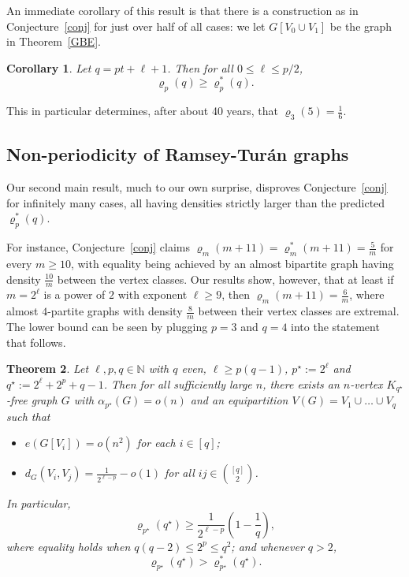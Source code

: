 \documentclass[11pt, a4paper]{article}
\newtheorem{theorem}{Theorem}[section]
\newtheorem{corollary}[theorem]{Corollary}
\theoremstyle{definition}
\begin{document}
An immediate corollary of this result is that there is a construction as in Conjecture~\ref{conj} for just over half of all cases: we let $G[V_0 \cup V_1]$ be the graph in Theorem~\ref{GBE}.


\begin{corollary}\label{cor}
	Let $q = pt+\ell+1$. Then for all $0 \leq \ell \leq p/2$, 
	$$\varrho_p(q) \geq \varrho_p^*(q).$$
\end{corollary}

This in particular determines, after about 40 years, that $\varrho_3(5)=\frac{1}{6}$.

\subsection{Non-periodicity of Ramsey-Tur\'an graphs}
Our second main result, much to our own surprise, disproves Conjecture~\ref{conj} for infinitely many cases, all having densities strictly larger than the predicted $\varrho_p^*(q)$. 

For instance, Conjecture~\ref{conj} claims $\varrho_m(m+11)=\varrho_m^*(m+11)=\frac{5}{m}$
for every $m \geq 10$, with equality being achieved by an almost bipartite graph having density $\frac{10}{m}$ between the vertex classes. Our results show, however, that at least if $m=2^\ell$ is a power of $2$ with exponent $\ell \geq 9$, then $\varrho_m(m+11)=\frac{6}{m}$, where almost $4$-partite graphs with density $\frac{8}{m}$ between their vertex classes are extremal. The lower bound can be seen by plugging $p=3$ and $q=4$ into the statement that follows.

\begin{theorem}\label{thm-2tri-exact}
	Let $\ell,p,q\in\mathbb{N}$ with $q$ even, $\ell \geq p(q-1)$, $p^{\star}:=2^\ell$ and $q^{\star}:=2^\ell+2^p+q-1$. Then for all sufficiently large $n$, there exists an $n$-vertex $K_{q^{\star}}$-free graph $G$ with $\alpha_{p^{\star}}(G)=o(n)$ and an  equipartition $V(G)=V_1\cup\ldots\cup V_q$ such that
	\begin{itemize}
		\item $e(G[V_i])=o(n^2)$ for each $i\in[q]$;
		
		\item $d_G(V_i,V_j)=\frac{1}{2^{\ell-p}}-o(1)$ for all $ij\in{[q]\choose 2}$.
	\end{itemize}
	In particular, 
	\begin{equation}\label{eq:multi-lower}
		\varrho_{p^{\star}}(q^{\star})\ge\frac{1}{2^{\ell-p}}\left(1-\frac{1}{q}\right),
	\end{equation}
	where equality holds when $q(q-2)\le 2^p\le q^2$; and whenever $q > 2$, $$\varrho_{p^{\star}}(q^{\star}) > \varrho_{p^{\star}}^*(q^{\star}).$$
\end{theorem}
\end{document}
